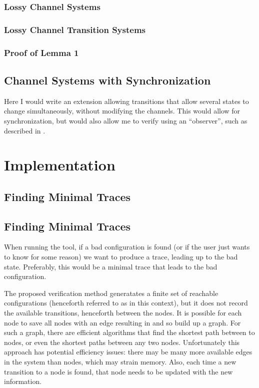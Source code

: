 \subsubsection{Lossy Channel Systems}
\subsubsection{Lossy Channel Transition Systems}
\subsubsection{Proof of Lemma 1}

\subsection{Channel Systems with Synchronization}
Here I would write an extension allowing transitions that allow several states to change simultaneously, without modifying the channels. This would allow for synchronization, but would also allow me to verify using an ``observer'', such as described in \cite{287591}. 



\section{Implementation}

\subsection{Finding Minimal Traces}
\subsection{Finding Minimal Traces}
When running the tool, if a bad configuration is found (or if the user just wants to know for some reason) we want to produce a trace, leading up to the bad state. Preferably, this would be a minimal trace that leads to the bad configuration.
 
The proposed verification method generatates a finite set of reachable configurations (henceforth referred to as  in this context), but it does not record the available transitions, henceforth  between the nodes. It is possible for each node  to save all nodes  with an edge resulting in  and so build up a graph. For such a graph, there are efficient algorithms that find the shortest path between to nodes, or even the shortest paths between any two nodes. Unfortunately this approach has potential efficiency issues: there may be many more available edges in the system than nodes, which may strain memory. Also, each time a new transition to a node is found, that node needs to be updated with the new information.
 
